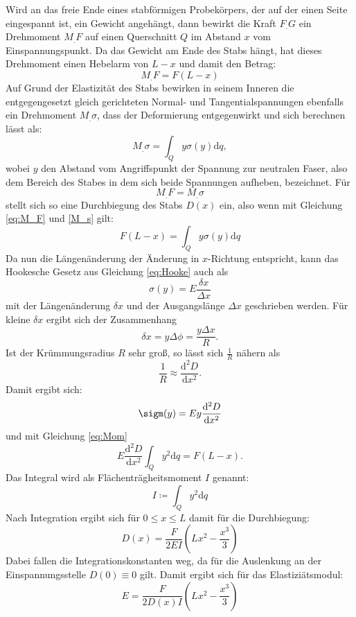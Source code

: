 Wird an das freie Ende eines stabförmigen Probekörpers, der auf der einen Seite eingespannt ist, ein Gewicht angehängt, dann bewirkt die Kraft $F_.G$ ein Drehmoment $M_.F$ auf einen Querschnitt $Q$ im Abstand $x$ vom Einspannungspunkt.
Da das Gewicht am Ende des Stabs hängt, hat dieses Drehmoment einen Hebelarm von $L-x$ und damit den Betrag:
\begin{equation}
M_.F = F(L-x) \label{eq:M_F}
\end{equation}
Auf Grund der Elastizität des Stabs bewirken in seinem Inneren die entgegengesetzt gleich gerichteten Normal- und Tangentialspannungen ebenfalls ein Drehmoment $M_.{\sigma}$, dass der Deformierung entgegenwirkt und sich berechnen lässt als:
\begin{equation}
M_.{\sigma} = \int_Q y \sigma (y) \mathrm{d}q, \label{M_s}
\end{equation}
wobei $y$ den Abstand vom Angriffspunkt der Spannung zur neutralen Faser, also dem Bereich des Stabes in dem sich beide Spannungen aufheben, bezeichnet.
Für
\begin{equation*}
M_.F = M_.{\sigma}
\end{equation*}
stellt sich so eine Durchbiegung des Stabs $D(x)$ ein, also wenn mit Gleichung \eqref{eq:M_F} und \eqref{M_s} gilt:
\begin{equation}
F(L-x) = \int_Q y \sigma (y) \mathrm{d}q \label{eq:Mom}
\end{equation}
Da nun die Längenänderung der Änderung in $x$-Richtung entspricht, kann das Hookesche Gesetz aus Gleichung \eqref{eq:Hooke} auch als 
\[
\sigma (y) = E \frac{\delta x}{\Delta x} 
\]
mit der Längenänderung $\delta x$ und der Ausgangslänge $\Delta x$ geschrieben werden.
Für kleine $\delta x$ ergibt sich der Zusammenhang 
\[
\delta x = y \Delta\phi = \frac{y\Delta x}{R} \text{.}
\]
Ist der Krümmungsradius $R$ sehr groß, so lässt sich $\frac{1}{R}$ nähern als
\[
\frac{1}{R}\approx \frac{\mathrm{d}^2D}{\mathrm{d}x^2}\text{.}
\]
Damit ergibt sich:
\[
\sigm (y) = E y \frac{\mathrm{d}^2D}{\mathrm{d}x^2}
\]
und mit Gleichung \eqref{eq:Mom}
\begin{equation}
E \frac{\mathrm{d}^2D}{\mathrm{d}x^2} \int_Q y^2 \mathrm{d}q = F(L-x)\text{.} \label{eq:Mom2}
\end{equation}
Das Integral wird als Flächenträgheitsmoment $I$ genannt:
\[
I \coloneqq \int_Q y^2 \mathrm{d}q
\]
Nach Integration ergibt sich für $0 \leq x \leq L$  damit für die Durchbiegung:
\begin{equation*}
D(x) = \frac{F}{2 E I}\left(L x^2 -\frac{x^3}{3}\right)
\end{equation*}
Dabei fallen die Integrationskonstanten weg, da für die Auslenkung an der Einspannungsstelle $D(0) \equiv 0$ gilt.
Damit ergibt sich für das Elastiziätsmodul:
\begin{equation}
E = \frac{F}{2 D(x) I}\left(L x^2 -\frac{x^3}{3}\right)\label{eq:E}
\end{equation}

